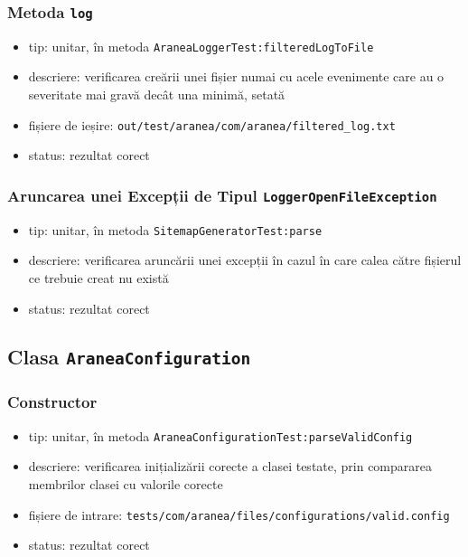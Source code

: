 \documentclass[12pt]{article}
\begin{document}
\subsubsection{Metoda \texttt{log}}

\begin{itemize}
    \item tip: unitar, în metoda \texttt{AraneaLoggerTest:filteredLogToFile}
    \item descriere: verificarea creării unei fișier numai cu acele evenimente care au o severitate mai gravă decât una minimă, setată
    \item fișiere de ieșire: \texttt{out/test/aranea/com/aranea/filtered_log.txt}
    \item status: rezultat corect
\end{itemize}

\subsubsection{Aruncarea unei Excepții de Tipul \texttt{LoggerOpenFileException}}

\begin{itemize}
    \item tip: unitar, în metoda \texttt{SitemapGeneratorTest:parse}
    \item descriere: verificarea aruncării unei excepții în cazul în care calea către fișierul ce trebuie creat nu există
    \item status: rezultat corect
\end{itemize}

\subsection{Clasa \texttt{AraneaConfiguration}}

\subsubsection{Constructor}

\begin{itemize}
    \item tip: unitar, în metoda \texttt{AraneaConfigurationTest:parseValidConfig}
    \item descriere: verificarea inițializării corecte a clasei testate, prin compararea membrilor clasei cu valorile corecte
    \item fișiere de intrare: \texttt{tests/com/aranea/files/configurations/valid.config}
    \item status: rezultat corect
\end{itemize}
\end{document}
